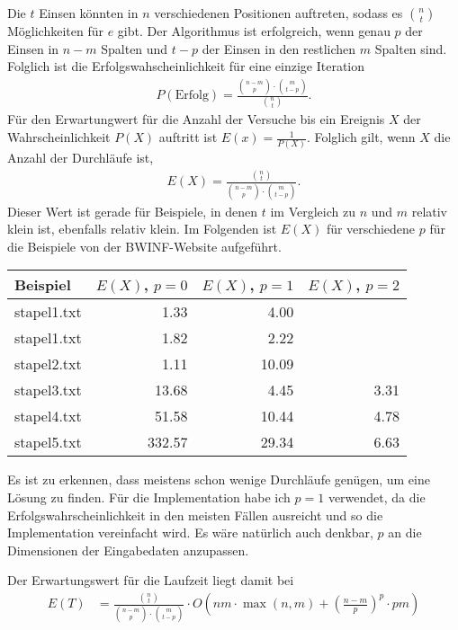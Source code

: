 \documentclass[a4paper,10pt,ngerman]{scrartcl}
\begin{document}
Die $t$ Einsen könnten in $n$ verschiedenen Positionen auftreten, sodass es $\binom{n}{t}$ Möglichkeiten für $e$ gibt. Der Algorithmus ist erfolgreich, wenn genau $p$ der Einsen in $n-m$ Spalten und $t-p$ der Einsen in den restlichen $m$ Spalten sind. Folglich ist die Erfolgswahscheinlichkeit für eine einzige Iteration 
\begin{align*}
    P(\text{Erfolg}) = \frac{\binom{n-m}{p} \cdot \binom{m}{t-p}}{\binom{n}{t}}.
\end{align*}
Für den Erwartungwert für die Anzahl der Versuche bis ein Ereignis $X$ der Wahrscheinlichkeit $P(X)$ auftritt ist $E(x) = \frac{1}{P(X)}$.
Folglich gilt, wenn $X$ die Anzahl der Durchläufe ist,
\begin{align*}
    E(X) = \frac{\binom{n}{t}}{\binom{n-m}{p} \cdot \binom{m}{t-p}}.
\end{align*} 
Dieser Wert ist gerade für Beispiele, in denen $t$ im Vergleich zu $n$ und $m$ relativ klein ist, ebenfalls relativ klein. 
Im Folgenden ist $E(X)$ für verschiedene $p$ für die Beispiele von der BWINF-Website aufgeführt.
\begin{table}[H]
    \centering
    \begin{tabular}{lrrr}
        \toprule
    
        Beispiel & $E(X)$, $p=0$ & $E(X)$, $p=1$ & $E(X)$, $p=2$ \\\midrule
        stapel1.txt &1.33	&4.00 &  \\
        stapel1.txt &1.82&	2.22&  \\
        stapel2.txt &1.11	&10.09&  \\
    stapel3.txt &13.68&	4.45&	3.31 \\
    stapel4.txt	&51.58&	10.44	&4.78 \\
    stapel5.txt	&332.57	&29.34&	6.63\\\bottomrule
    \end{tabular}
\end{table}
Es ist zu erkennen, dass meistens schon wenige Durchläufe genügen, um eine Lösung zu finden. 
Für die Implementation habe ich $p=1$ verwendet, da die Erfolgswahrscheinlichkeit in den meisten Fällen ausreicht und so die Implementation vereinfacht wird. Es wäre natürlich auch denkbar, $p$ an die Dimensionen der Eingabedaten anzupassen.

Der Erwartungswert für die Laufzeit liegt damit bei 
\begin{align*}
    E(T) &= \frac{\binom{n}{t}}{\binom{n-m}{p} \cdot \binom{m}{t-p}} \cdot O\left(nm \cdot \max(n, m) +\left(\frac{n-m}{p}\right)^p \cdot pm\right) \\
\end{align*}
\end{document}
